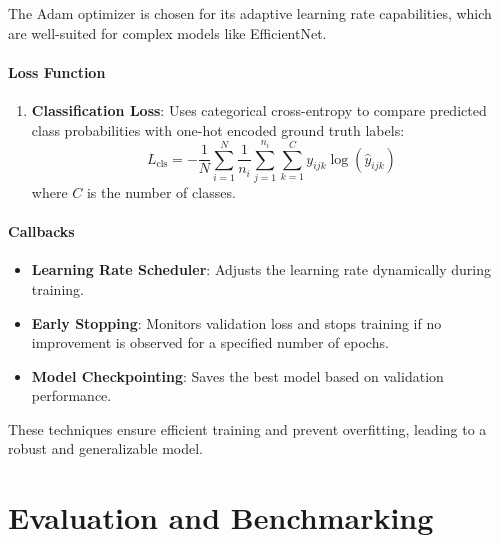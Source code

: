 The Adam optimizer is chosen for its adaptive learning rate capabilities, which are well-suited for complex models like EfficientNet.

\paragraph{Loss Function}
\begin{enumerate}
    
    \item \textbf{Classification Loss}: Uses categorical cross-entropy to compare predicted class probabilities with one-hot encoded ground truth labels:
    \[
    L_{\text{cls}} = - \frac{1}{N} \sum_{i=1}^{N} \frac{1}{n_i} \sum_{j=1}^{n_i} \sum_{k=1}^{C} y_{ijk} \log(\hat{y}_{ijk})
    \]
    where \(C\) is the number of classes.
\end{enumerate}

\paragraph{Callbacks}
\begin{itemize}
    \item \textbf{Learning Rate Scheduler}: Adjusts the learning rate dynamically during training.
    \item \textbf{Early Stopping}: Monitors validation loss and stops training if no improvement is observed for a specified number of epochs.
    \item \textbf{Model Checkpointing}: Saves the best model based on validation performance.
\end{itemize}

These techniques ensure efficient training and prevent overfitting, leading to a robust and generalizable model.

\section{Evaluation and Benchmarking}

